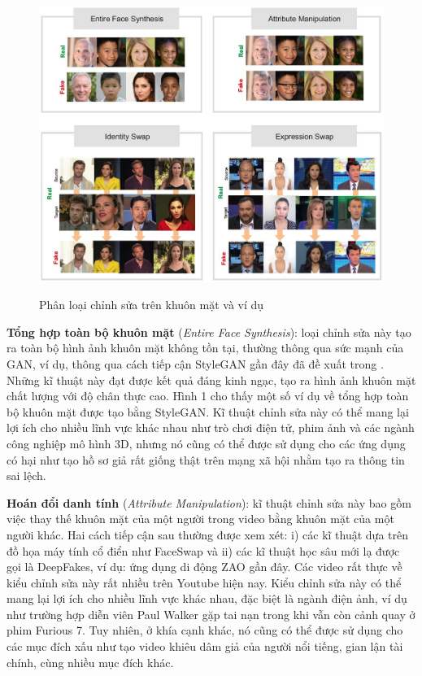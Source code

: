 \documentclass{article}
\begin{document}
\begin{figure}[h!]
\caption{Phân loại chỉnh sửa trên khuôn mặt và ví dụ}
\includegraphics[width=\textwidth]{fig-1-category-and-example}
\label{fig-1-category-and-example}
\end{figure}

\textbf{Tổng hợp toàn bộ khuôn mặt} (\textit{Entire Face Synthesis}): loại chỉnh sửa này tạo ra toàn bộ hình ảnh khuôn mặt không tồn tại, thường thông qua sức mạnh của GAN, ví dụ, thông qua cách tiếp cận StyleGAN gần đây đã đề xuất trong . Những kĩ thuật này đạt được kết quả đáng kinh ngạc, tạo ra hình ảnh khuôn mặt chất lượng với độ chân thực cao. Hình 1 cho thấy một số ví dụ về tổng hợp toàn bộ khuôn mặt được tạo bằng StyleGAN. Kĩ thuật chỉnh sửa này có thể mang lại lợi ích cho nhiều lĩnh vực khác nhau như trò chơi điện tử, phim ảnh và các ngành công nghiệp mô hình 3D, nhưng nó cũng có thể được sử dụng cho các ứng dụng có hại như tạo hồ sơ giả rất giống thật trên mạng xã hội nhằm tạo ra thông tin sai lệch.

\textbf{Hoán đổi danh tính} (\textit{Attribute Manipulation}): kĩ thuật chỉnh sửa này bao gồm việc thay thế khuôn mặt của một người trong video bằng khuôn mặt của một người khác. Hai cách tiếp cận sau thường được xem xét: i) các kĩ thuật dựa trên đồ họa máy tính cổ điển như FaceSwap và ii) các kĩ thuật học sâu mới lạ được gọi là DeepFakes, ví dụ: ứng dụng di động ZAO gần đây. Các video rất thực về kiểu chỉnh sửa này rất nhiều trên Youtube hiện nay. Kiểu chỉnh sửa này có thể mang lại lợi ích cho nhiều lĩnh vực khác nhau, đặc biệt là ngành điện ảnh, ví dụ như trường hợp diễn viên Paul Walker gặp tai nạn trong khi vẫn còn cảnh quay ở phim Furious 7. Tuy nhiên, ở khía cạnh khác, nó cũng có thể được sử dụng cho các mục đích xấu như tạo video khiêu dâm giả của người nổi tiếng, gian lận tài chính, cùng nhiều mục đích khác.
\end{document}
